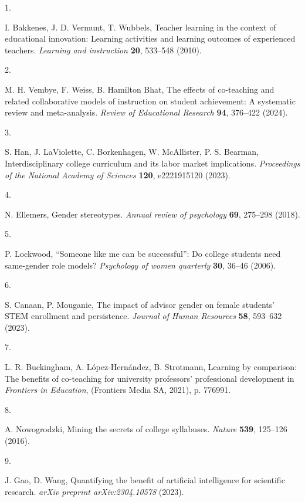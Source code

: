 \documentclass[
  12pt,
]{article}
\newlength{\cslhangindent}
\newlength{\csllabelwidth}
\newenvironment{CSLReferences}[2] %
 {\begin{list}{}{%
  \setlength{\itemindent}{0pt}
  \setlength{\leftmargin}{0pt}
  \setlength{\parsep}{0pt}
  \ifodd #1
   \setlength{\leftmargin}{\cslhangindent}
   \setlength{\itemindent}{-1\cslhangindent}
  \fi
  \setlength{\itemsep}{#2\baselineskip}}}
 {\end{list}}
\newcommand{\CSLLeftMargin}[1]{\parbox[t]{\csllabelwidth}{\strut#1\strut}}
\newcommand{\CSLRightInline}[1]{\parbox[t]{\linewidth - \csllabelwidth}{\strut#1\strut}}
\begin{document}
\label{refs}
\begin{CSLReferences}{0}{1}
\CSLLeftMargin{1. }%
\CSLRightInline{I. Bakkenes, J. D. Vermunt, T. Wubbels, Teacher learning in the context of educational innovation: Learning activities and learning outcomes of experienced teachers. \emph{Learning and instruction} \textbf{20}, 533--548 (2010).}

\CSLLeftMargin{2. }%
\CSLRightInline{M. H. Vembye, F. Weiss, B. Hamilton Bhat, The effects of co-teaching and related collaborative models of instruction on student achievement: A systematic review and meta-analysis. \emph{Review of Educational Research} \textbf{94}, 376--422 (2024).}

\CSLLeftMargin{3. }%
\CSLRightInline{S. Han, J. LaViolette, C. Borkenhagen, W. McAllister, P. S. Bearman, Interdisciplinary college curriculum and its labor market implications. \emph{Proceedings of the National Academy of Sciences} \textbf{120}, e2221915120 (2023).}

\CSLLeftMargin{4. }%
\CSLRightInline{N. Ellemers, Gender stereotypes. \emph{Annual review of psychology} \textbf{69}, 275--298 (2018).}

\CSLLeftMargin{5. }%
\CSLRightInline{P. Lockwood, {``Someone like me can be successful''}: Do college students need same-gender role models? \emph{Psychology of women quarterly} \textbf{30}, 36--46 (2006).}

\CSLLeftMargin{6. }%
\CSLRightInline{S. Canaan, P. Mouganie, The impact of advisor gender on female students' STEM enrollment and persistence. \emph{Journal of Human Resources} \textbf{58}, 593--632 (2023).}

\CSLLeftMargin{7. }%
\CSLRightInline{L. R. Buckingham, A. López-Hernández, B. Strotmann, Learning by comparison: The benefits of co-teaching for university professors' professional development in \emph{Frontiers in Education}, (Frontiers Media SA, 2021), p. 776991.}

\CSLLeftMargin{8. }%
\CSLRightInline{A. Nowogrodzki, Mining the secrets of college syllabuses. \emph{Nature} \textbf{539}, 125--126 (2016).}

\CSLLeftMargin{9. }%
\CSLRightInline{J. Gao, D. Wang, Quantifying the benefit of artificial intelligence for scientific research. \emph{arXiv preprint arXiv:2304.10578} (2023).}


\end{CSLReferences}
\end{document}
